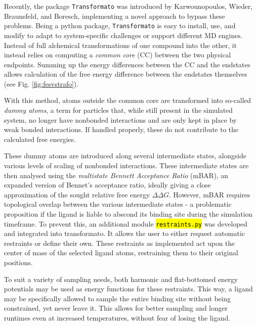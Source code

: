 \documentclass[oneside]{scrreprt}
\newcommand{\code}[1]{\texttt{\hl{#1}}}
\begin{document}
Recently, the package \texttt{Transformato} was introduced by Karwounopoulos, Wieder, Braunsfeld, and Boresch\cite{Karwou2022Jun,braunsfeldImplementationTestingCHARMM,Wieder2022Jun}, implementing a novel approach to bypass these problems. Being a python package, \texttt{Transformato} is easy to install, use, and modify to adapt to system-specific challenges or support different MD engines. Instead of full alchemical transformations of one compound into the other, it instead relies on computing a \emph{common core} (CC) between the two physical endpoints. Summing up the energy differences between the CC and the endstates allows calculation of the free energy difference between the endstates themselves (see Fig. \ref{fig:fesvstrafo}).



With this method, atoms outside the common core are transformed into so-called \emph{dummy atoms}, a term for particles that, while still present in the simulated system, no longer have nonbonded interactions and are only kept in place by weak bonded interactions. If handled properly, these do not contribute to the calculated free energies\cite{fleckDummyAtomsAlchemical2021}.

These dummy atoms are introduced along several intermediate states, alongside various levels of scaling of nonbonded interactions. These intermediate states are then analysed using the \emph{multistate Bennett Acceptance Ratio}\cite{shirts_statistically_2008} (mBAR), an expanded version of Bennet's acceptance ratio\cite{Bennett1976Oct}, ideally giving a close approximation of the sought relative free energy $\Delta\Delta G$. However, mBAR requires topological overlap between the various intermediate states - a problematic proposition if the ligand is liable to abscond its binding site during the simulation timeframe. To prevent this, an additional module \code{restraints.py} was developed and integrated into transformato. It allows the user to either request automatic restraints or define their own. These restraints as implemented act upon the center of mass of the selected ligand atoms, restraining them to their original positions.

To suit a variety of sampling needs, both harmonic and flat-bottomed energy potentials may be used as energy functions for these restraints. This way, a ligand may be specifically allowed to sample the entire binding site without being constrained, yet never leave it. This allows for better sampling and longer runtimes even at increased temperatures, without fear of losing the ligand.
\end{document}
